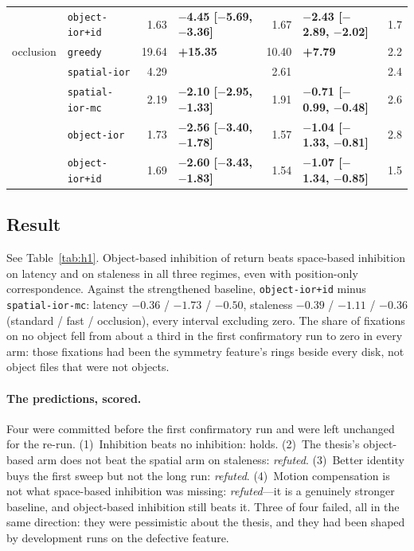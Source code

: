 \documentclass[11pt,a4paper]{article}
\newcommand{\arm}[1]{\texttt{#1}}
\newcommand{\sig}[1]{\textbf{#1}} %
\begin{document}
\begin{table}[t]
\begin{tabularx}{\linewidth}{@{}llrXrXr@{}}
         & \arm{object-ior+id}   &  1.63 & \sig{$-$4.45 [$-$5.69, $-$3.36]} & 1.67 & \sig{$-$2.43 [$-$2.89, $-$2.02]} & 1.7 \\
\addlinespace
occlusion& \arm{greedy}          & 19.64 & \sig{+15.35} & 10.40 & \sig{+7.79} & 2.2 \\
         & \arm{spatial-ior}     &  4.29 &  &  2.61 &  & 2.4 \\
         & \arm{spatial-ior-mc}  &  2.19 & \sig{$-$2.10 [$-$2.95, $-$1.33]} & 1.91 & \sig{$-$0.71 [$-$0.99, $-$0.48]} & 2.6 \\
         & \arm{object-ior}      &  1.73 & \sig{$-$2.56 [$-$3.40, $-$1.78]} & 1.57 & \sig{$-$1.04 [$-$1.33, $-$0.81]} & 2.8 \\
         & \arm{object-ior+id}   &  1.69 & \sig{$-$2.60 [$-$3.43, $-$1.83]} & 1.54 & \sig{$-$1.07 [$-$1.34, $-$0.85]} & 1.5 \\
\bottomrule
\end{tabularx}
\end{table}

\subsection{Result}
See Table~\ref{tab:h1}. Object-based inhibition of return beats space-based
inhibition on latency and on staleness in all three regimes, even with
position-only correspondence. Against the strengthened baseline,
\arm{object-ior+id} minus \arm{spatial-ior-mc}: latency $-0.36$ / $-1.73$ /
$-0.50$, staleness $-0.39$ / $-1.11$ / $-0.36$ (standard / fast / occlusion),
every interval excluding zero. The share of fixations on no object fell from
about a third in the first confirmatory run to zero in every arm: those
fixations had been the symmetry feature's rings beside every disk, not object
files that were not objects.

\paragraph{The predictions, scored.} Four were committed before the first
confirmatory run and were left unchanged for the re-run. (1)~Inhibition beats no
inhibition: holds. (2)~The thesis's object-based arm does not beat the spatial
arm on staleness: \emph{refuted}. (3)~Better identity buys the first sweep but
not the long run: \emph{refuted}. (4)~Motion compensation is not what space-based
inhibition was missing: \emph{refuted}---it is a genuinely stronger baseline, and
object-based inhibition still beats it. Three of four failed, all in the same
direction: they were pessimistic about the thesis, and they had been shaped by
development runs on the defective feature.
\end{document}
